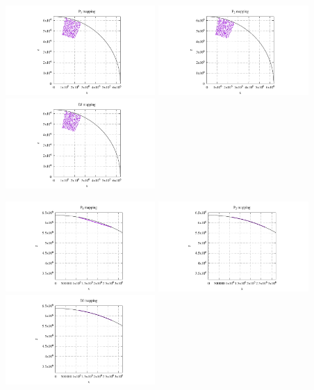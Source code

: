 \begin{center}
\includegraphics[width=5.7cm]{images/mappings/DJ/quadrilaterals/xz_P1.pdf}
\includegraphics[width=5.7cm]{images/mappings/DJ/quadrilaterals/xz_P2.pdf}
\includegraphics[width=5.7cm]{images/mappings/DJ/quadrilaterals/xz_DJ.pdf}
\end{center}

\begin{center}
\includegraphics[width=5.7cm]{images/mappings/DJ/quadrilaterals/xz_P1_boundary.pdf}
\includegraphics[width=5.7cm]{images/mappings/DJ/quadrilaterals/xz_P2_boundary.pdf}
\includegraphics[width=5.7cm]{images/mappings/DJ/quadrilaterals/xz_DJ_boundary.pdf}
\end{center}

